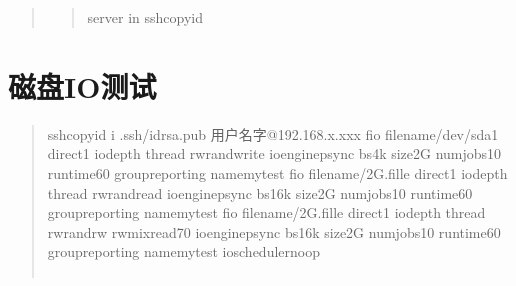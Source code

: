 \documentclass[a4paper,10pt,english]{sphinxmanual}
\begin{document}
\begin{quote}
\begin{quote}
\begin{sphinxVerbatim}[commandchars=\\\{\},numbers=left,firstnumber=1,stepnumber=1]
 server in 
    sshcopyid 
\end{sphinxVerbatim}
\sphinxresetverbatimhllines
\end{quote}
\end{quote}


\section{磁盘IO测试}
\label{\detokenize{linux/shell:io}}\begin{quote}

\begin{sphinxVerbatim}[commandchars=\\\{\}]
ssh\PYGZhy{}copy\PYGZhy{}id \PYGZhy{}i .ssh/id\PYGZus{}rsa.pub  用户名字@192.168.x.xxx
fio \PYGZhy{}filename\PYGZhy{}/dev/sda1 \PYGZhy{}direct\PYGZhy{}1 \PYGZhy{}iodepth  \PYGZhy{}thread \PYGZhy{}rw\PYGZhy{}randwrite \PYGZhy{}ioengine\PYGZhy{}psync \PYGZhy{}bs\PYGZhy{}4k \PYGZhy{}size\PYGZhy{}2G \PYGZhy{}numjobs\PYGZhy{}10 \PYGZhy{}runtime\PYGZhy{}60 \PYGZhy{}group\PYGZus{}reporting \PYGZhy{}name\PYGZhy{}mytest
fio \PYGZhy{}filename\PYGZhy{}/2G.fille  \PYGZhy{}direct\PYGZhy{}1 \PYGZhy{}iodepth  \PYGZhy{}thread \PYGZhy{}rw\PYGZhy{}randread \PYGZhy{}ioengine\PYGZhy{}psync \PYGZhy{}bs\PYGZhy{}16k \PYGZhy{}size\PYGZhy{}2G \PYGZhy{}numjobs\PYGZhy{}10 \PYGZhy{}runtime\PYGZhy{}60 \PYGZhy{}group\PYGZus{}reporting \PYGZhy{}name\PYGZhy{}mytest
fio \PYGZhy{}filename\PYGZhy{}/2G.fille \PYGZhy{}direct\PYGZhy{}1 \PYGZhy{}iodepth  \PYGZhy{}thread \PYGZhy{}rw\PYGZhy{}randrw \PYGZhy{}rwmixread\PYGZhy{}70 \PYGZhy{}ioengine\PYGZhy{}psync \PYGZhy{}bs\PYGZhy{}16k \PYGZhy{}size\PYGZhy{}2G \PYGZhy{}numjobs\PYGZhy{}10 \PYGZhy{}runtime\PYGZhy{}60 \PYGZhy{}group\PYGZus{}reporting \PYGZhy{}name\PYGZhy{}mytest \PYGZhy{}ioscheduler\PYGZhy{}noop
\end{sphinxVerbatim}



\begin{savenotes}\sphinxattablestart
\centering
\begin{tabulary}{\linewidth}[t]{|T|T|}
\hline


\end{tabulary}
\end{savenotes}
\end{quote}
\end{document}
